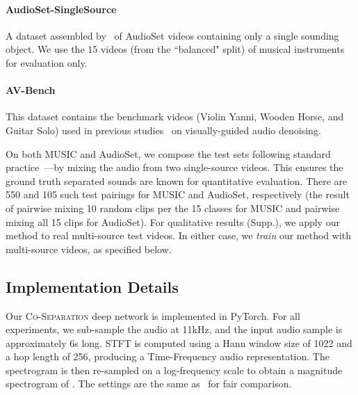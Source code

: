 \documentclass[10pt,twocolumn,letterpaper]{article}
\begin{document}
\paragraph{AudioSet-SingleSource} 
A dataset assembled by~\cite{gao2018objectSounds} of AudioSet videos containing only a single sounding object. We use the 15 videos (from the ``balanced" split) of musical instruments for evaluation only.   
\vspace*{-0.15in}
\paragraph{AV-Bench}
This dataset contains the benchmark videos (Violin Yanni, Wooden Horse, and Guitar Solo) used in previous studies~\cite{gao2018objectSounds,pu2017audio} on visually-guided audio denoising.

\vspace*{0.05in}

On both MUSIC and AudioSet, we compose the test sets following standard practice~\cite{barzelay2007harmony,zhao2018sound,owens2018audio,gao2018objectSounds}---by mixing the audio from two single-source videos.  This ensures the ground truth separated sounds are known for quantitative evaluation. There are 550 and 105 such test pairings for MUSIC and AudioSet, respectively (the result of pairwise mixing 10 random clips per the 15 classes for MUSIC and pairwise mixing all 15 clips for AudioSet).  For qualitative results (Supp.), we apply our method to real multi-source test videos. In either case, we \emph{train} our method with multi-source videos, as specified below.

\subsection{Implementation Details}\label{exp:implementaiton}
Our \textsc{Co-Separation} deep network is implemented in PyTorch. For all experiments, we sub-sample the audio at 11kHz, and the input audio sample is approximately 6s long. STFT is computed using a Hann window size of 1022 and a hop length of 256, producing a  Time-Frequency audio representation. The spectrogram is then re-sampled on a log-frequency scale to obtain a  magnitude spectrogram of . The settings are the same as~\cite{zhao2018sound} for fair comparison. 
\end{document}

